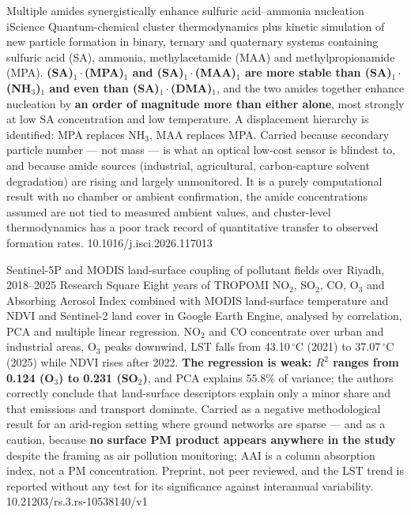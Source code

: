 \documentclass[10pt]{article}
\begin{document}

{Multiple amides synergistically enhance sulfuric acid--ammonia nucleation}
{iScience}
{Quantum-chemical cluster thermodynamics plus kinetic simulation of new particle formation
in binary, ternary and quaternary systems containing sulfuric acid (SA), ammonia,
methylacetamide (MAA) and methylpropionamide (MPA). \textbf{(SA)$_1\cdot$(MPA)$_1$ and
(SA)$_1\cdot$(MAA)$_1$ are more stable than (SA)$_1\cdot$(NH$_3$)$_1$ and even than
(SA)$_1\cdot$(DMA)$_1$}, and the two amides together enhance nucleation by
\textbf{an order of magnitude more than either alone}, most strongly at low SA
concentration and low temperature. A displacement hierarchy is identified: MPA replaces
NH$_3$, MAA replaces MPA. Carried because secondary particle number --- not mass --- is
what an optical low-cost sensor is blindest to, and because amide sources (industrial,
agricultural, carbon-capture solvent degradation) are rising and largely unmonitored. It is
a purely computational result with no chamber or ambient confirmation, the amide
concentrations assumed are not tied to measured ambient values, and cluster-level
thermodynamics has a poor track record of quantitative transfer to observed formation
rates.}
{10.1016/j.isci.2026.117013}

{Sentinel-5P and MODIS land-surface coupling of pollutant fields over Riyadh, 2018--2025}
{Research Square}
{Eight years of TROPOMI NO$_2$, SO$_2$, CO, O$_3$ and Absorbing Aerosol Index combined with
MODIS land-surface temperature and NDVI and Sentinel-2 land cover in Google Earth Engine,
analysed by correlation, PCA and multiple linear regression. NO$_2$ and CO concentrate over
urban and industrial areas, O$_3$ peaks downwind, LST falls from 43.10\,$^\circ$C (2021) to
37.07\,$^\circ$C (2025) while NDVI rises after 2022. \textbf{The regression is weak:
$R^2$ ranges from 0.124 (O$_3$) to 0.231 (SO$_2$)}, and PCA explains 55.8\% of variance;
the authors correctly conclude that land-surface descriptors explain only a minor share and
that emissions and transport dominate. Carried as a negative methodological result for an
arid-region setting where ground networks are sparse --- and as a caution, because
\textbf{no surface PM product appears anywhere in the study} despite the framing as air
pollution monitoring; AAI is a column absorption index, not a PM concentration. Preprint,
not peer reviewed, and the LST trend is reported without any test for its significance
against interannual variability.}
{10.21203/rs.3.rs-10538140/v1}
\end{document}

